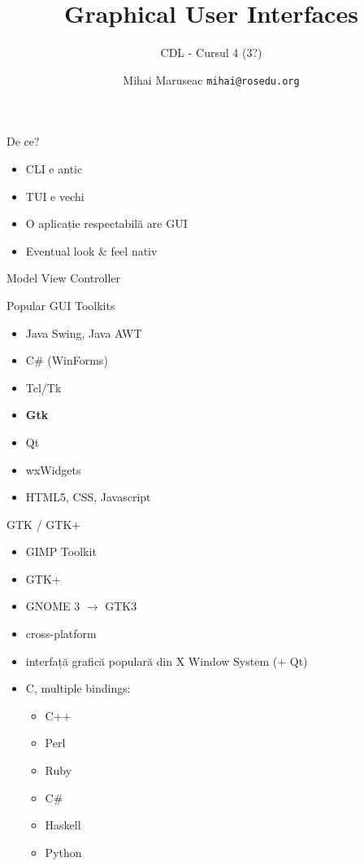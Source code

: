 \documentclass{beamer}
\title[GUI]{Graphical User Interfaces}
\subtitle{CDL - Cursul 4 (3?)}
\institute[ROSEdu]{ROSEdu}
\author[MM]{Mihai Maruseac \texttt{mihai@rosedu.org}}
\begin{document}
\maketitle

\begin{frame}{De ce?}
  \begin{itemize}[<+->]
    \item CLI e antic
    \item TUI e vechi
    \item O aplicație respectabilă are GUI
    \item Eventual look \& feel nativ
  \end{itemize}
\end{frame}

\begin{frame}{Model View Controller}
  \begin{center}
  \end{center}
\end{frame}

\begin{frame}{Popular GUI Toolkits}
  \begin{itemize}
    \item Java Swing, Java AWT
    \item C\# (WinForms)
    \item Tcl/Tk
    \item \textbf{Gtk}
    \item Qt
    \item wxWidgets
    \item HTML5, CSS, Javascript
  \end{itemize}
\end{frame}

\begin{frame}{GTK / GTK+}
  \begin{itemize}[<+->]
    \item GIMP Toolkit
    \item GTK+
    \item GNOME 3 $\rightarrow$ GTK3
    \item cross-platform
    \item interfață grafică populară din X Window System (+ Qt)
    \item C, multiple bindings:
      \begin{itemize}
        \item C++
        \item Perl
        \item Ruby
        \item C\#
        \item Haskell
        \item Python
      \end{itemize}
  \end{itemize}
\end{frame}
\end{document}
